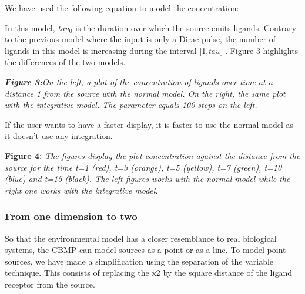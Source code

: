 \documentclass[11.5pt]{article}
\begin{document}
We have used the following equation to model the concentration: 

\begin{figure}[H]
\centering
\end{figure}




In this model, {\itshape tau$_{0}$} is the duration over which the 
source emits ligands. Contrary to the previous model where the input is 
only a Dirac pulse, the number of ligands in this model is increasing 
during the interval $[$1,{\itshape tau$_{0}$}$]$. Figure 3 
highlights the differences of the two models.

\begin{figure}[H]
\centering
\end{figure}


{\bfseries {\itshape Figure 3:}}{\itshape  On the left, a plot of the 
concentration of ligands over time at a distance 1 from the source with 
the normal model. On the right, the same plot with the integrative 
model. The parameter equals 100 steps on the left. }



If the user wants to have a faster display, it is faster to use the 
normal model as it doesn't use any integration. 





\begin{figure}[H]
\centering
\end{figure}
\begin{figure}[H]
\centering
\end{figure}




{\bfseries Figure 4:} {\itshape The figures display the plot concentration 
against the distance from the source for the time t=1 (red), t=3 
(orange), t=5 (yellow), t=7 (green), t=10 (blue) and t=15 (black). The 
left figures works with the normal model while the right one works with 
the integrative model. } 



\subsubsection{From one dimension to two}
So that the environmental model has a closer resemblance to real 
biological systems, the CBMP can model sources as a point or as a line. 
To model point-sources, we have made a simplification using the 
separation of the variable technique. This consists of replacing the x2 
by the square distance of the ligand receptor from the source.
\end{document}
